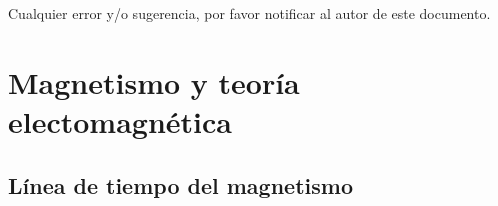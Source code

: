 \documentclass[a4paper,10pt]{article}
\begin{document}
Cualquier error y/o sugerencia, por favor notificar al autor de este documento.

\renewcommand{\labelitemi}{\ding{226}}
\renewcommand{\labelitemii}{\ding{226}}
\renewcommand{\labelitemiii}{\ding{226}}
\renewcommand{\labelitemiv}{\ding{226}}



\section{Magnetismo y teoría electomagnética}


\subsection{Línea de tiempo del magnetismo}
\end{document}
